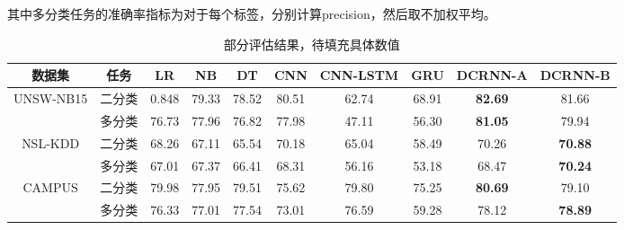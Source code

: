其中多分类任务的准确率指标为对于每个标签，分别计算precision，然后取不加权平均。

\begin{table*}[t]
    \small
    \caption{部分评估结果，待填充具体数值}
    \label{table2}
    \centering
    \begin{tabular}{c|c|ccc|ccc|cc}
    \toprule
    
     数据集 &  任务  &  
     LR &  NB & DT & CNN & CNN-LSTM & GRU & DCRNN-A & DCRNN-B \\
    \midrule
    
    
    UNSW-NB15 & 二分类 & 0.848 & 79.33 & 78.52 &  80.51 & 62.74 & 68.91 & \textbf{82.69} & 81.66 \\ 
    
    & 多分类 &76.73 & 77.96 & 76.82 & 77.98 & 47.11 & 56.30 & \textbf{81.05} & 79.94 \\
    
    \midrule
    NSL-KDD & 二分类 & 68.26 & 67.11 & 65.54 & 70.18 & 65.04 & 58.49 & 70.26 & \textbf{70.88} \\
    & 多分类 & 67.01 & 67.37 & 66.41 & 68.31 & 56.16 & 53.18 & 68.47 & \textbf{70.24} \\
    \midrule
    CAMPUS & 二分类 & 79.98 & 77.95 & 79.51 & 75.62 & 79.80 & 75.25 & \textbf{80.69} & 79.10\\
    & 多分类 & 76.33 & 77.01 & 77.54 & 73.01 & 76.59 & 59.28 & 78.12 & \textbf{78.89}\\
    
     \bottomrule
    
    \end{tabular}
    \end{table*}

